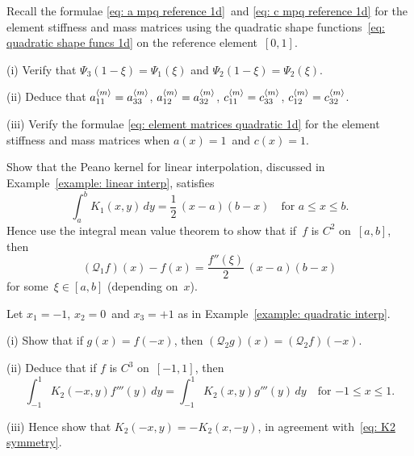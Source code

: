 \begin{Exercises}

\exercise
Recall the formulae \eqref{eq: a mpq reference 1d}~and
\eqref{eq: c mpq reference 1d} for the element stiffness and mass matrices using 
the quadratic shape functions~\eqref{eq: quadratic shape funcs 1d} on the 
reference element~$[0,1]$. 
\begin{description}
\item{(i)} Verify that $\Psi_3(1-\xi)=\Psi_1(\xi)$ and 
$\Psi_2(1-\xi)=\Psi_2(\xi)$.
\item{(ii)} Deduce that
$a^{\langle m\rangle}_{11}=a^{\langle m\rangle}_{33}$, $a^{\langle m\rangle}_{12}=a^{\langle m\rangle}_{32}$,
$c^{\langle m\rangle}_{11}=c^{\langle m\rangle}_{33}$, $c^{\langle m\rangle}_{12}=c^{\langle m\rangle}_{32}$.
\item{(iii)} Verify the formulae \eqref{eq: element matrices quadratic 1d}
for the element stiffness and mass matrices when $a(x)=1$~and $c(x)=1$.
\end{description}

\exercise
Show that the Peano kernel for linear interpolation, discussed in 
Example~\ref{example: linear interp}, satisfies
\[
\int_a^b K_1(x,y)\,dy=\frac{1}{2}\,(x-a)(b-x)\quad\text{for $a\le x\le b$.}
\]
Hence use the integral mean value theorem to show that if~$f$ is $C^2$ 
on~$[a,b]$, then 
\[
(\mathcal{Q}_1f)(x)-f(x)=\frac{f''(\xi)}{2}\,(x-a)(b-x)
\]
for some~$\xi\in[a,b]$ (depending on~$x$).

\exercise
Let $x_1=-1$, $x_2=0$~and $x_3=+1$ as in 
Example~\ref{example: quadratic interp}.  
\begin{description}
\item{(i)} Show that if $g(x)=f(-x)$, then 
$(\mathcal{Q}_2g)(x)=(\mathcal{Q}_2f)(-x)$.
\item{(ii)} Deduce that if $f$ is $C^3$ on~$[-1,1]$, then
\[
\int_{-1}^1K_2(-x,y)f'''(y)\,dy=\int_{-1}^1K_2(x,y)g'''(y)\,dy
	\quad\text{for $-1\le x\le 1$.}
\]
\item{(iii)} Hence show that $K_2(-x,y)=-K_2(x,-y)$, in agreement 
with~\eqref{eq: K2 symmetry}.
\end{description}

\end{Exercises}
